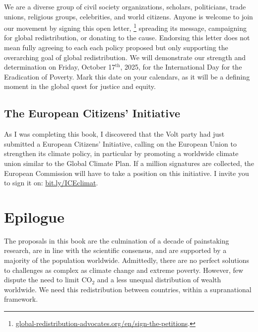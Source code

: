 \documentclass[a5paper,english,openany]{memoir}
\begin{document}
We are a diverse group of civil society organizations, scholars, politicians, trade unions, religious groups, celebrities, and world citizens. Anyone is welcome to join our movement by signing  %
this open letter,
\footnote{\href{https://global-redistribution-advocates.org/fr/signer-les-petitions/?238=true}{global-redistribution-advocates.org/en/sign-the-petitions}.} 
spreading its message, campaigning for global redistribution, or donating to the cause. Endorsing this letter does not mean fully agreeing to each each policy proposed but %
only supporting the overarching goal of global redistribution. We will demonstrate our strength and determination %
on Friday, October 17$^\text{th}$, 2025, for the International Day for the Eradication of Poverty. Mark this date on your calendars, as it will be %
a defining moment in the global quest for justice and equity.

\section{The European Citizens' Initiative}

As I was completing %
this book, I discovered that the Volt party had just submitted a European Citizens' Initiative, calling on the European Union to strengthen its climate policy, in particular by promoting a worldwide climate union similar to the Global Climate Plan. If a million signatures are collected, the European Commission will have to take a position on this initiative. I invite you to sign it on: \href{https://citizens-initiative.europa.eu/initiatives/details/2024/000005_fr}{bit.ly/ICEclimat}.

\chapter{Epilogue} %

The proposals in this book are the culmination %
of a decade of painstaking research, are in line with the scientific consensus, and are supported by a majority of the population worldwide. 
Admittedly, there are no perfect solutions to challenges as complex as climate change and extreme poverty. 
However, few dispute the need to limit CO$_\text{2}$ and %
a less unequal distribution of wealth worldwide. We need %
this redistribution between countries, within a supranational framework. 
\end{document}
